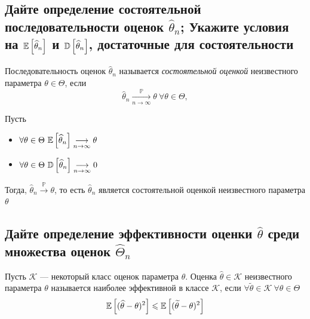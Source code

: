 \documentclass{article}
\begin{document}
\subsection{Дайте определение состоятельной последовательности оценок $\widehat{\theta}_n$; Укажите условия на $\mathbb{E}\left[\widehat{\theta}_n\right]$ и $\mathbb{D}\left[\widehat{\theta}_n\right]$, достаточные для состоятельности}
 Последовательность оценок $\hat{\theta}_n$ называется \textit{состоятельной оценкой} неизвестного параметра $\theta\in\Theta$, если
\begin{equation*}
    \hat{\theta}_n\underset{n\to\infty}{\overset{\mathbb{P}}{\longrightarrow}}\theta\ \forall \theta\in\Theta,
\end{equation*}

\theorem Пусть 
\begin{itemize}
    \item $\forall\theta\in\Theta\ \matwait{\widehat{\theta}_n}\underset{n\to\infty}{\longrightarrow}\theta$
    \item $\forall\theta\in\Theta\ \dispersia{\widehat{\theta}_n}\underset{n\to\infty}{\longrightarrow}0$
\end{itemize}
Тогда, $\widehat{\theta}_n\overset{\mathbb{P}}{\longrightarrow}\theta$, то есть $\widehat{\theta}_n$ является состоятельной оценкой  неизвестного параметра $\theta$




\subsection{Дайте определение эффективности оценки $\widehat{\theta}$ среди множества оценок $\widehat{\Theta}_n$}
 Пусть $\mathcal{K}$ — некоторый класс оценок параметра $\theta$. Оценка $\widehat{\theta}\in\mathcal{K}$ неизвестного параметра $\theta$ называется наиболее эффективной в классе $\mathcal{K}$, если $\forall\widetilde{\theta}\in\mathcal{K}\ \forall \theta\in\Theta$
\begin{equation*}
    \begin{aligned}
        \mathbb{E}\left[(\widehat{\theta}-\theta)^2\right]\leqslant\mathbb{E}\left[(\widetilde{\theta}-\theta)^2\right]
    \end{aligned}
\end{equation*}

\end{document}
